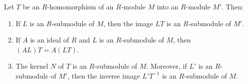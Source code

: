 Let $T$ be an $R$-homomorphism of an $R$-module $M$ into an $R$-module $M'$. Then:

\begin{enumerate}
\item If $L$ is an $R$-submodule of $M$, then the image $LT$ is an $R$-submodule of $M'$.
\item If $A$ is an ideal of $R$ and $L$ is an $R$-submodule of $M$, then $(AL)T = A(LT)$.
\item The kernel $N$ of $T$ is an $R$-submodule of $M$. Moreover, if $L'$ is an $R$-submodule of $M'$, then the inverse image $L'T^{-1}$ is an $R$-submodule of $M$.
\end{enumerate}
